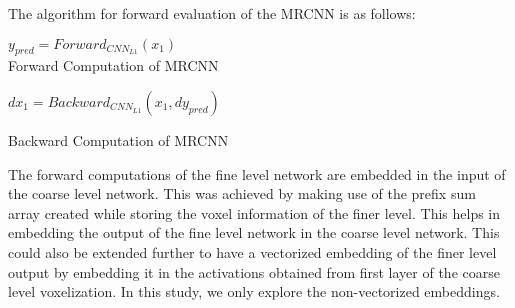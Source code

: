 \documentclass[10pt,letterpaper]{article}
\begin{document}
The algorithm for forward evaluation of the MRCNN is as follows:\\
\begin{minipage}{.49\textwidth}
\begin{algorithm}[H]
	
    $y_{pred} = Forward_{CNN_{L1}}(x_1)$\\
	\caption{Forward Computation of MRCNN}
	\label{Alg:Forward}
\vspace{1.5pt}
\end{algorithm}
\end{minipage}%
\begin{minipage}{.5\textwidth}
\vspace{0pt}  
\begin{algorithm}[H]
    $dx_1 = Backward_{CNN_{L1}}(x_1, dy_{pred})$
	
	\caption{Backward Computation of MRCNN}
	\label{Alg:Backward}
\end{algorithm}
\end{minipage}



The forward computations of the fine level network are embedded in the input of the coarse level network. This was achieved by making use of the prefix sum array created while storing the voxel information of the finer level. This helps in embedding the output of the fine level network in the coarse level network. This could also be extended further to have a vectorized embedding of the finer level output by embedding it in the activations obtained from first layer of the coarse level voxelization. In this study, we only explore the non-vectorized embeddings.
\end{document}
